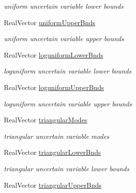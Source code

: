 \begin{DoxyCompactItemize}
\begin{DoxyCompactList}\small\item\em uniform uncertain variable lower bounds \end{DoxyCompactList}\item 
Real\+Vector \hyperlink{classPecos_1_1AleatoryDistParamsRep_a17a62f7ac0fd3a4df8f56525b23ecd76}{uniform\+Upper\+Bnds}\label{classPecos_1_1AleatoryDistParamsRep_a17a62f7ac0fd3a4df8f56525b23ecd76}

\begin{DoxyCompactList}\small\item\em uniform uncertain variable upper bounds \end{DoxyCompactList}\item 
Real\+Vector \hyperlink{classPecos_1_1AleatoryDistParamsRep_a7d0818e97ffe5a9207ae601dae6a7c72}{loguniform\+Lower\+Bnds}\label{classPecos_1_1AleatoryDistParamsRep_a7d0818e97ffe5a9207ae601dae6a7c72}

\begin{DoxyCompactList}\small\item\em loguniform uncertain variable lower bounds \end{DoxyCompactList}\item 
Real\+Vector \hyperlink{classPecos_1_1AleatoryDistParamsRep_acd94891b11d8ae79ca1f5b4baccc6841}{loguniform\+Upper\+Bnds}\label{classPecos_1_1AleatoryDistParamsRep_acd94891b11d8ae79ca1f5b4baccc6841}

\begin{DoxyCompactList}\small\item\em loguniform uncertain variable upper bounds \end{DoxyCompactList}\item 
Real\+Vector \hyperlink{classPecos_1_1AleatoryDistParamsRep_a5b319c504c563b259ad5b52c0ecb13b2}{triangular\+Modes}\label{classPecos_1_1AleatoryDistParamsRep_a5b319c504c563b259ad5b52c0ecb13b2}

\begin{DoxyCompactList}\small\item\em triangular uncertain variable modes \end{DoxyCompactList}\item 
Real\+Vector \hyperlink{classPecos_1_1AleatoryDistParamsRep_ae2e0f312573546f36b882a3ce733f13b}{triangular\+Lower\+Bnds}\label{classPecos_1_1AleatoryDistParamsRep_ae2e0f312573546f36b882a3ce733f13b}

\begin{DoxyCompactList}\small\item\em triangular uncertain variable lower bounds \end{DoxyCompactList}\item 
Real\+Vector \hyperlink{classPecos_1_1AleatoryDistParamsRep_ad618a5965225ddfd9eca953a0443dbc8}{triangular\+Upper\+Bnds}\label{classPecos_1_1AleatoryDistParamsRep_ad618a5965225ddfd9eca953a0443dbc8}


\end{DoxyCompactItemize}
